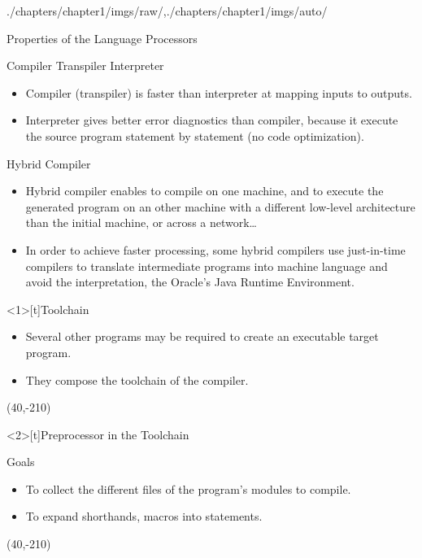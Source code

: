 \begin{graphicspathcontext}{{./chapters/chapter1/imgs/raw/},{./chapters/chapter1/imgs/auto/}}
\begin{bibunit}[apalike]
\begin{frame}{Properties of the Language Processors}
	\begin{smaller}
	\begin{block}{Compiler \vs Transpiler \vs Interpreter}
	\begin{itemize}
	\item Compiler (transpiler) is faster than interpreter at mapping inputs to outputs.
	\item Interpreter gives better error diagnostics than compiler, because it execute the source program statement by statement (no code optimization).
	\end{itemize}
	\end{block}
	\begin{block}{Hybrid Compiler}
	\begin{itemize}
	\item Hybrid compiler enables to compile on one machine, and to execute the generated program on an other machine with a different low-level architecture than the initial machine, or across a network\dots
	\item In order to achieve faster processing, some hybrid compilers use just-in-time compilers to translate intermediate programs into machine language and avoid the interpretation, \eg the Oracle's Java Runtime Environment.
	\end{itemize}
	\end{block}
	\end{smaller}
\end{frame}

\begin{frame}<1>[t]{Toolchain}
	\begin{itemize}
	\item Several other programs may be required to create an executable target program.
	\item They compose the toolchain of the compiler.
	\end{itemize}
	\putat(40,-210){\includeanimatedfigure[width=.8\linewidth]{toolchain}}
\end{frame}

\begin{frame}<2>[t]{Preprocessor in the Toolchain}
	\begin{smaller}
	\begin{block}{\smaller Goals}
	\begin{itemize}
	\item To collect the different files of the program's modules to compile.
	\item To expand shorthands, macros into statements.
	\end{itemize}
	\end{block}
	\end{smaller}
	\putat(40,-210){}
\end{frame}


\end{bibunit}
\end{graphicspathcontext}
